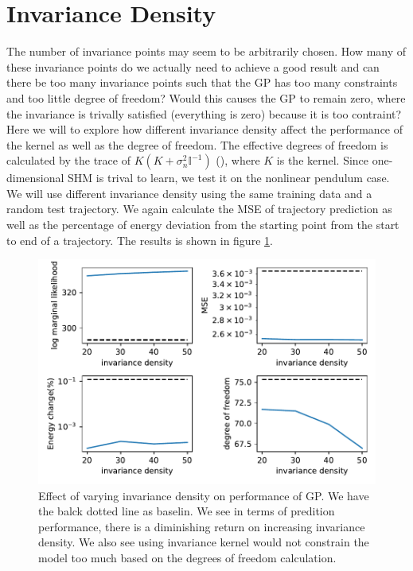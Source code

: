 \documentclass{statsmsc}
\begin{document}
\section{Invariance Density}
The number of invariance points may seem to be arbitrarily chosen. 
How many of these invariance points do we actually need to achieve a good result and can there be too many invariance points such that the GP has too many constraints and too little degree of freedom?
Would this causes the GP to remain zero, where the invariance is trivally satisfied (everything is zero) because it is too contraint?
Here we will to explore how different invariance density affect the performance of the kernel as well as the degree of freedom.
The effective degrees of freedom is calculated by the trace of $K(K+\sigma^2_n\mathbb{I}^{-1})$ (\cite{rasmussen_williams_2006}), where $K$ is the kernel.
Since one-dimensional SHM is trival to learn, we test it on the nonlinear pendulum case.
We will use different invariance density using the same training data and a random test trajectory.
We again calculate the MSE of trajectory prediction as well as the percentage of energy deviation from the starting point from the start to end of a trajectory.
The results is shown in figure \ref{fig:vary_invariance_density}.

\begin{figure}[H] 
  \includegraphics[width=0.8\linewidth]{../codes/figures/vary_invariance.pdf}
  \centering
  \caption{Effect of varying invariance density on performance of GP. We have the balck dotted line as baselin. We see in terms of predition performance, there is a diminishing return on increasing invariance density. We also see using invariance kernel would not constrain the model too much based on the degrees of freedom calculation.}
  \label{fig:vary_invariance_density}
\end{figure}
\end{document}

